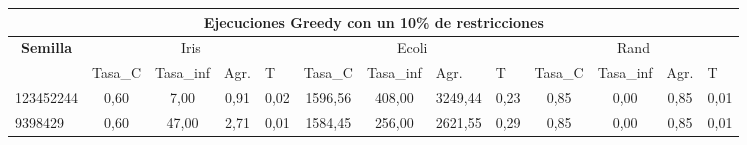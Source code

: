 \documentclass[12pt, spanish]{article}
\begin{document}
\begin{table}[H]

\small

\begin{adjustwidth}{-1cm}{-1cm}%

\begin{tabular}{|l|c|c|c|c|c|c|c|c|c|c|c|c|}
\hline
\multicolumn{13}{|c|}{\textbf{Ejecuciones Greedy con un 10\% de restricciones}}                                                                                                                                                                                                                                                                                                                                        \\ \hline
\multicolumn{1}{|c|}{\multirow{2}{*}{\textbf{Semilla}}} & \multicolumn{4}{c|}{Iris}                                                                                          & \multicolumn{4}{c|}{Ecoli}                                                                                         & \multicolumn{4}{c|}{Rand}                                                                                          \\ \cline{2-13} 
\multicolumn{1}{|c|}{}                                  & \multicolumn{1}{l|}{Tasa\_C} & \multicolumn{1}{l|}{Tasa\_inf} & \multicolumn{1}{l|}{Agr.} & \multicolumn{1}{l|}{T} & \multicolumn{1}{l|}{Tasa\_C} & \multicolumn{1}{l|}{Tasa\_inf} & \multicolumn{1}{l|}{Agr.} & \multicolumn{1}{l|}{T} & \multicolumn{1}{l|}{Tasa\_C} & \multicolumn{1}{l|}{Tasa\_inf} & \multicolumn{1}{l|}{Agr.} & \multicolumn{1}{l|}{T} \\ \hline
123452244                                               & 0,60                         & 7,00                           & 0,91                      & 0,02                   & 1596,56                      & 408,00                         & 3249,44                   & 0,23                   & 0,85                         & 0,00                           & 0,85                      & 0,01                   \\ \hline
9398429                                                 & 0,60                         & 47,00                          & 2,71                      & 0,01                   & 1584,45                      & 256,00                         & 2621,55                   & 0,29                   & 0,85                         & 0,00                           & 0,85                      & 0,01                   \\ \hline

\end{tabular}
\end{adjustwidth}
\end{table}
\end{document}
